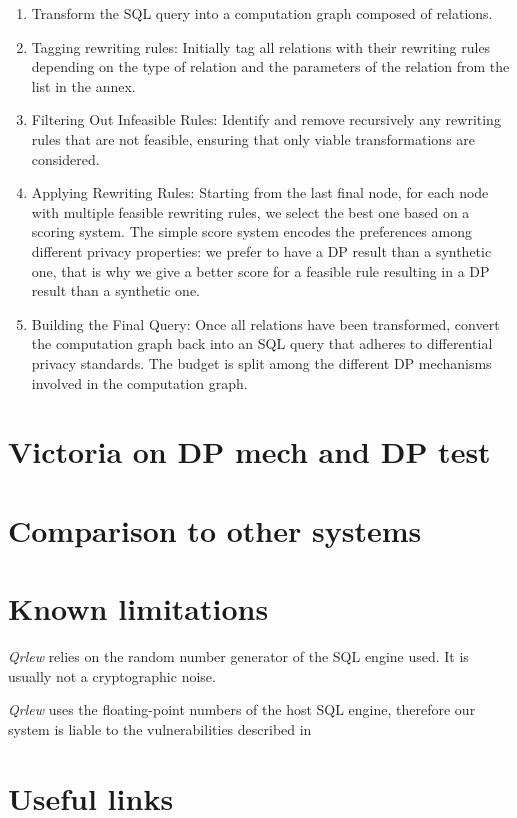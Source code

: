 \documentclass[letterpaper]{article} %
\newcommand{\qrlew}{\emph{Qrlew}}
\begin{document}
\begin{enumerate}
    \item Transform the SQL query into a computation graph composed of relations.
    \item Tagging rewriting rules: Initially tag all relations with their rewriting rules depending on the type of relation and the parameters of the relation from the list in the annex.
    \item Filtering Out Infeasible Rules: Identify and remove recursively any rewriting rules that are not feasible, ensuring that only viable transformations are considered.
    \item Applying Rewriting Rules: Starting from the last final node, for each node with multiple feasible rewriting rules, we select the best one based on a scoring system. The simple score system encodes the preferences among different privacy properties: we prefer to have a DP result than a synthetic one, that is why we give a better score for a feasible rule resulting in a DP result than a synthetic one.
    \item Building the Final Query: Once all relations have been transformed, convert the computation graph back into an SQL query that adheres to differential privacy standards. The budget is split among the different DP mechanisms involved in the computation graph.
\end{enumerate}


\section{Victoria on DP mech and DP test}

\section{Comparison to other systems}

\section{Known limitations}

\qrlew{} relies on the random number generator of the SQL engine used. It is usually not a cryptographic noise.

\qrlew{} uses the floating-point numbers of the host SQL engine, therefore our system is liable to the vulnerabilities described in 


\section*{Useful links}
\end{document}
